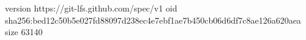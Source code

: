 version https://git-lfs.github.com/spec/v1
oid sha256:bed12c50b5e027fd88097d238ec4e7ebf1ae7b450cb06d6df7c8ae126a620aea
size 63140
